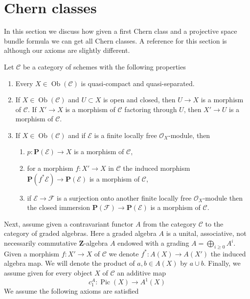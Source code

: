 \documentclass{stacks-project}
\theoremstyle{plain}
\theoremstyle{definition}
\theoremstyle{remark}
\numberwithin{equation}{subsection}
\def\Ob{\mathop{\mathrm{Ob}}\nolimits}
\def\Pic{\mathop{\mathrm{Pic}}\nolimits}
\begin{document}
\section{Chern classes}
\label{section-chern}

\noindent
In this section we discuss how given a first Chern class and a projective
space bundle formula we can get all Chern classes.
A reference for this section is \cite{Grothendieck-chern} although our
axioms are slightly different.

\medskip\noindent
Let $\mathcal{C}$ be a category of schemes with the following properties
\begin{enumerate}
\item Every $X \in \Ob(\mathcal{C})$ is quasi-compact and quasi-separated.
\item If $X \in \Ob(\mathcal{C})$ and $U \subset X$ is open and closed,
then $U \to X$ is a morphism of $\mathcal{C}$. If $X' \to X$ is a morphism
of $\mathcal{C}$ factoring through $U$, then $X' \to U$ is a morphism
of $\mathcal{C}$.
\item If $X \in \Ob(\mathcal{C})$ and if $\mathcal{E}$ is a finite
locally free $\mathcal{O}_X$-module, then
\begin{enumerate}
\item $p : \mathbf{P}(\mathcal{E}) \to X$ is a morphism of $\mathcal{C}$,
\item for a morphism $f : X' \to X$ in $\mathcal{C}$ the
induced morphism $\mathbf{P}(f^*\mathcal{E}) \to \mathbf{P}(\mathcal{E})$
is a morphism of $\mathcal{C}$,
\item if $\mathcal{E} \to \mathcal{F}$ is a surjection onto another finite
locally free $\mathcal{O}_X$-module then the closed immersion
$\mathbf{P}(\mathcal{F}) \to \mathbf{P}(\mathcal{E})$
is a morphism of $\mathcal{C}$.
\end{enumerate}
\end{enumerate}
Next, assume given a contravariant functor $A$ from the
category $\mathcal{C}$ to the category of graded algebras.
Here a graded algebra $A$ is a unital, associative,
not necessarily commutative $\mathbf{Z}$-algebra $A$ endowed with a grading
$A = \bigoplus_{i \geq 0} A^i$. Given a morphism
$f : X' \to X$ of $\mathcal{C}$ we denote $f^* : A(X) \to A(X')$ the
induced algebra map.
We will denote the product of $a, b \in A(X)$ by $a \cup b$.
Finally, we assume
given for every object $X$ of $\mathcal{C}$ an additive  map
$$
c_1^A : \Pic(X) \longrightarrow A^1(X)
$$
We assume the following axioms are satisfied
\end{document}
